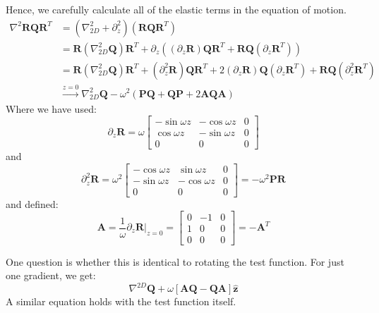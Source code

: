 \documentclass[reqno]{article}
\newcommand{\Q}{\mathbf{Q}}
\newcommand{\R}{\mathbf{R}}
\newcommand{\bP}{\mathbf{P}}
\newcommand{\A}{\mathbf{A}}
\begin{document}
Hence, we carefully calculate all of the elastic terms in the equation of motion.
\begin{equation}
\begin{split}
    \nabla^2 \R \Q \R^T
    &=
    \left(\nabla_{2D}^2 + \partial_z^2 \right) \left( \R \Q \R^T \right) \\
    &=
    \R \left( \nabla_{2D}^2 \Q \right) \R^T
    + \partial_z \left(
        (\partial_z \R) \Q \R^T
        + \R \Q \left( \partial_z \R^T \right)
    \right) \\
    &=
    \R \left( \nabla_{2D}^2 \Q \right) \R^T
    + (\partial^2_z \R) \Q \R^T
    + 2 (\partial_z \R ) \Q (\partial_z \R^T)
    + \R \Q \left( \partial^2_z \R^T \right) \\
    &\stackrel{z = 0}{\to} 
    \nabla_{2D}^2 \Q
    -\omega^2 \left( 
        \bP \Q
        + \Q \bP
        + 2 \A \Q \A
    \right)
\end{split}
\end{equation}
Where we have used:
\begin{equation}
    \partial_z \R
    =
    \omega \begin{bmatrix}
        -\sin \omega z &-\cos \omega z &0 \\
        \cos \omega z &-\sin \omega z &0 \\
        0 &0 &0
    \end{bmatrix}
\end{equation}
and
\begin{equation}
    \partial^2_z \R
    =
    \omega^2 \begin{bmatrix}
        -\cos \omega z &\sin \omega z &0 \\
        -\sin \omega z &-\cos \omega z &0 \\
        0 &0 &0
    \end{bmatrix}
    =
    - \omega^2 \bP \R
\end{equation}
and defined:
\begin{equation}
    \A
    =
    \frac{1}{\omega}
    \left. \partial_z \R \right|_{z = 0}
    =
    \begin{bmatrix}
        0 &-1 &0 \\
        1 &0 &0 \\
        0 &0 &0
    \end{bmatrix}
    =
    -\A^T
\end{equation}

One question is whether this is identical to rotating the test function. 
For just one gradient, we get:
\begin{equation}
    \nabla^{2D} \Q
    + \omega \left[ \A \Q - \Q \A \right] \mathbf{\hat{z}}
\end{equation}
A similar equation holds with the test function itself.
\end{document}
